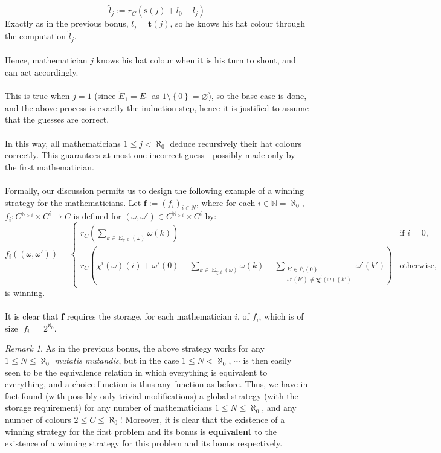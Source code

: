 \documentclass[11pt, a4paper, oneside]{article}
\theoremstyle{remark}
\newtheorem*{remark}{Remark}
\theoremstyle{lemma}
\begin{document}
\[
\tilde{l}_j := r_{C}\left( \mathbf{s}(j) + l_0 - l_j \right)
\]
Exactly as in the previous bonus, \(\tilde{l}_j = \mathbf{t}(j)\), so he knows his hat colour through the computation \(\tilde{l}_j\).
\\\\
Hence, mathematician \(j\) knows his hat colour when it is his turn to shout, and can act accordingly.
\\\\
This is true when \(j = 1\) (since \(\tilde{E}_1 = E_1\) as \(1 \setminus \left\{0\right\} = \varnothing\)), so the base case is done, and the above process is exactly the induction step, hence it is justified to assume that the guesses are correct.
\\\\
In this way, all mathematicians \(1 \leq j < \aleph_0\) deduce recursively their hat colours correctly. This guarantees at most one incorrect guess—possibly made only by the first mathematician.
\\\\
Formally, our discussion permits us to design the following example of a winning strategy for the mathematicians. Let \(\mathbf{f} := \left( f_i \right)_{i \in N}\), where for each \(i \in \mathbb{N} = \aleph_0\), \(f_i : C^{\mathbb{N}_{>i}} \times C^i \rightarrow C\) is defined for \(\left( \omega, \omega' \right) \in C^{\mathbb{N}_{>i}} \times C^i\) by:
\[
f_i\left( \left( \omega, \omega' \right) \right) =
\begin{cases}
r_{C}\left( \sum_{k \in \operatorname{E}_{\chi,0}(\omega)} \omega(k) \right) & \text{if } i = 0, \\
r_{C}\left( \chi^{i}(\omega)(i) + \omega'(0) - \sum_{k \in \operatorname{E}_{\chi,i}(\omega)} \omega(k) - \sum_{\substack{k' \in i \setminus \left\{0\right\} \\ \omega'(k') \neq \mathbf{\chi}^{i}(\omega)(k')}} \omega'(k') \right) & \text{otherwise},
\end{cases}
\]
is winning.
\\\\
It is clear that \(\mathbf{f}\) requires the storage, for each mathematician \(i\), of \(f_i\), which is of size \(\left| f_i \right| = 2^{\aleph_0}\).
\begin{remark}
As in the previous bonus, the above strategy works for any \(1 \leq N \leq \aleph_0\) \textit{mutatis mutandis}, but in the case \(1 \leq N < \aleph_0\), \(\sim\) is then easily seen to be the equivalence relation in which everything is equivalent to everything, and a choice function is thus any function as before. Thus, we have in fact found (with possibly only trivial modifications) a global strategy (with the storage requirement) for any number of mathematicians \(1 \leq N \leq \aleph_0\), and any number of colours \(2 \leq C \leq \aleph_0\)! Moreover, it is clear that the existence of a winning strategy for the first problem and its bonus is \textbf{equivalent} to the existence of a winning strategy for this problem and its bonus respectively.
\end{remark}
\end{document}
